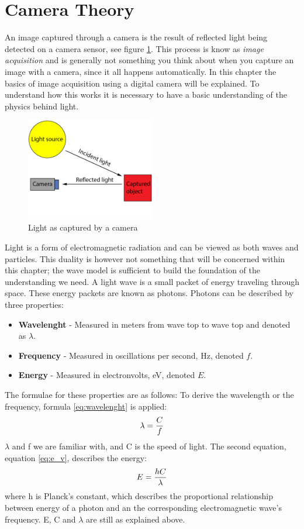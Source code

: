 \section{Camera Theory}
An image captured through a camera is the result of reflected light being detected on a camera sensor, see figure \ref{fig:light_cam}. This process is know as \textit{image acquisition} and is generally not something you think about when you capture an image with a camera, since it all happens automatically. In this chapter the basics of image acquisition using a digital camera will be explained. To understand how this works it is necessary to have a basic understanding of the physics behind light.

\begin{figure}[htbp] 
\centering 
\includegraphics[width=0.5\textwidth]{Pictures/Theory/light_from_sun.png} 
\caption{Light as captured by a camera} 
\label{fig:light_cam} 
\end{figure}

Light is a form of electromagnetic radiation and can be viewed as both waves and particles. This duality is however not something that will be concerned within this chapter; the wave model is sufficient to build the foundation of the understanding we need. A light wave is a small packet of energy traveling through space. These energy packets are known as photons. Photons can be described by three properties:

\begin{itemize}
\item \textbf{Wavelenght} - Measured in meters from wave top to wave top and denoted as $\lambda$.
\item \textbf{Frequency} - Measured in oscillations per second, Hz, denoted $f$.
\item \textbf{Energy} - Measured in electronvolts, eV, denoted $E$.
\end{itemize}

The formulae for these properties are as follows:
To derive the wavelength or the frequency, formula \ref{eq:wavelenght} is applied:
\begin{align}
\centering 
\lambda = \frac{C}{f}
\label{eq:wavelenght} 
\end{align}
$\lambda$ and f we are familiar with, and C is the speed of light. The second equation, equation \ref{eq:e_v}, describes the energy:
\begin{align}
\centering
E = \frac{hC}{\lambda}
\label{eq:e_v} 
\end{align}
where h is Planck's constant, which describes the proportional relationship between energy of a photon and an the corresponding electromagnetic wave's frequency. E, C and $\lambda$ are still as explained above.

